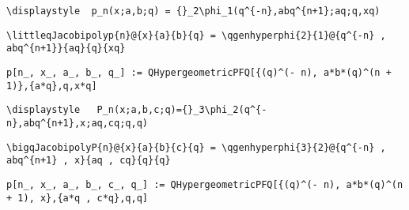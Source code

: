 \newsavebox\DDT
\begin{lrbox}{\DDT}
 \begin{minipage}[t]{0.82\textwidth}
  \lstinline[language={[latex]TeX},mathescape,breaklines=true]"\displaystyle  p_n(x;a,b;q) = {}_2\phi_1(q^{-n},abq^{n+1};aq;q,xq)"
 \end{minipage}
\end{lrbox}
\newsavebox\DDST
\begin{lrbox}{\DDST}
 \begin{minipage}[t]{0.82\textwidth}
  \lstinline[language={[latex]TeX},mathescape,breaklines=true]"\littleqJacobipolyp{n}@{x}{a}{b}{q} = \qgenhyperphi{2}{1}@{q^{-n} , abq^{n+1}}{aq}{q}{xq}"
 \end{minipage}
\end{lrbox}
\newsavebox\DDMM
\begin{lrbox}{\DDMM}
 \begin{minipage}[t]{0.82\textwidth}
  \lstinline[language={[latex]TeX},mathescape,breaklines=true]"p[n_, x_, a_, b_, q_] := QHypergeometricPFQ[{(q)^(- n), a*b*(q)^(n + 1)},{a*q},q,x*q]"
 \end{minipage}
\end{lrbox}
\newsavebox\DDMA
\begin{lrbox}{\DDMA}
 \begin{minipage}[t]{0.82\textwidth}
  \lstinline[language={[latex]TeX},mathescape,breaklines=true]""
 \end{minipage}
\end{lrbox}
\newsavebox\DET
\begin{lrbox}{\DET}
 \begin{minipage}[t]{0.82\textwidth}
  \lstinline[language={[latex]TeX},mathescape,breaklines=true]"\displaystyle   P_n(x;a,b,c;q)={}_3\phi_2(q^{-n},abq^{n+1},x;aq,cq;q,q)"
 \end{minipage}
\end{lrbox}
\newsavebox\DEST
\begin{lrbox}{\DEST}
 \begin{minipage}[t]{0.82\textwidth}
  \lstinline[language={[latex]TeX},mathescape,breaklines=true]"\bigqJacobipolyP{n}@{x}{a}{b}{c}{q} = \qgenhyperphi{3}{2}@{q^{-n} , abq^{n+1} , x}{aq , cq}{q}{q}"
 \end{minipage}
\end{lrbox}
\newsavebox\DEMM
\begin{lrbox}{\DEMM}
 \begin{minipage}[t]{0.82\textwidth}
  \lstinline[language={[latex]TeX},mathescape,breaklines=true]"p[n_, x_, a_, b_, c_, q_] := QHypergeometricPFQ[{(q)^(- n), a*b*(q)^(n + 1), x},{a*q , c*q},q,q]"
 \end{minipage}
\end{lrbox}
